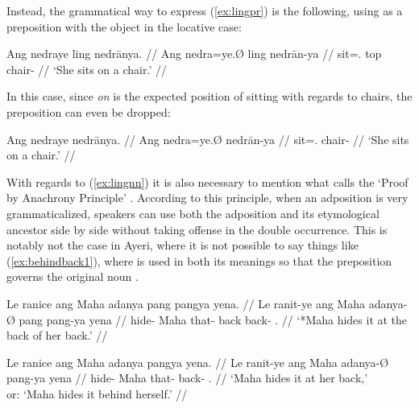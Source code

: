 \xe


\noindent Instead, the grammatical way to express (\ref{ex:lingpr}) is the 
following, using  as a preposition with the object in the 
locative case:

\ex\begingl
	\gla Ang nedraye ling nedrānya. //
	\glb Ang nedra=ye.Ø ling nedrān-ya //
	\glc \AgtT{} sit=\TsgF{}.\Top{} top chair-\Loc{} //
	\glft `She sits on a chair.' //
\endgl\xe

In this case, since \emph{on} is the expected position of sitting with regards 
to chairs, the preposition can even be dropped:

\ex\begingl
	\gla Ang nedraye nedrānya. //
	\glb Ang nedra=ye.Ø nedrān-ya //
	\glc \AgtT{} sit=\TsgF{}.\Top{} chair-\Loc{} //
	\glft `She sits on a chair.' //
\endgl\xe

With regards to (\ref{ex:lingnn}) it is also necessary to mention what 
\citet{hagege2010} calls the `Proof by Anachrony Principle' 
\citep[158--159]{hagege2010}. According to this principle, when an adposition 
is very grammaticalized, speakers can use both the adposition and its 
etymological ancestor side by side without taking offense in the double 
occurrence. This is notably not the case in Ayeri, where it is not possible to 
say things like (\ref{ex:behindback1}), where  is used in both 
its meanings so that the preposition  governs the 
original noun .

\pex
\a\label{ex:behindback1}\ljudge* \begingl
	\gla Le ranice ang Maha adanya pang pangya yena. //
	\glb Le ranit-ye ang Maha adanya-Ø pang pang-ya yena //
	\glc \PatTI{} hide-\TsgF{} \Aarg{} Maha that-\Top{} back back-\Loc{} 
		\TsgF{}.\Gen{} //
	\glft `*Maha hides it at the back of her back.' //
\endgl

\a\label{ex:behindback2}\begingl
	\gla Le ranice ang Maha adanya pangya yena. //
	\glb Le ranit-ye ang Maha adanya-Ø pang-ya yena //
	\glc \PatTI{} hide-\TsgF{} \Aarg{} Maha that-\Top{} back-\Loc{} 
		\TsgF{}.\Gen{} //
	\glft `Maha hides it at her back,'\\
		or: `Maha hides it behind herself.' //
\endgl

\xe

